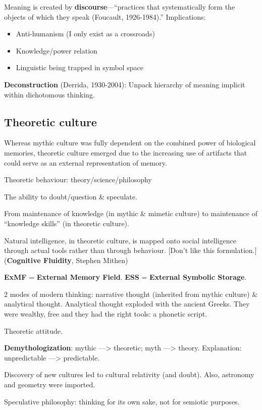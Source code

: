 \documentclass{article}
\begin{document}
Meaning is created by \textbf{discourse}---“practices that systematically form the objects of which they speak (Foucault, 1926-1984).” Implications:
\begin{itemize}
  \item Anti-humanism (I only exist as a crossroads)
  \item Knowledge/power relation
  \item Linguistic being trapped in symbol space
\end{itemize}

\textbf{Deconstruction} (Derrida, 1930-2004): Unpack hierarchy of meaning implicit within dichotomous thinking.

\subsection{Theoretic culture}

Whereas mythic culture was fully dependent on the combined power of biological
memories, theoretic culture emerged due to the increasing use of artifacts
that could serve as an external representation of memory.

Theoretic behaviour: theory/science/philosophy

The ability to doubt/question \& speculate.

From maintenance of knowledge (in mythic \& mimetic culture) to maintenance of ``knowledge skills'' (in theoretic culture).

Natural intelligence, in theoretic culture, is mapped onto social intelligence through actual tools rather than through behaviour. [Don't like this formulation.]
(\textbf{Cognitive Fluidity}, Stephen Mithen)

\textbf{ExMF} = \textbf{External Memory Field}.
\textbf{ESS} = \textbf{External Symbolic Storage}.

2 modes of modern thinking: narrative thought (inherited from mythic culture) \& analytical thought.
Analytical thought exploded with the ancient Greeks. They were wealthy, free and they had the right tools: a phonetic script.

Theoretic attitude.

\textbf{Demythologization}: mythic ---> theoretic; myth ---> theory. Explanation: unpredictable ---> predictable.

Discovery of new cultures led to cultural relativity (and doubt). Also, astronomy and geometry were imported.

Speculative philosophy: thinking for its own sake, not for semiotic purposes.
\end{document}
